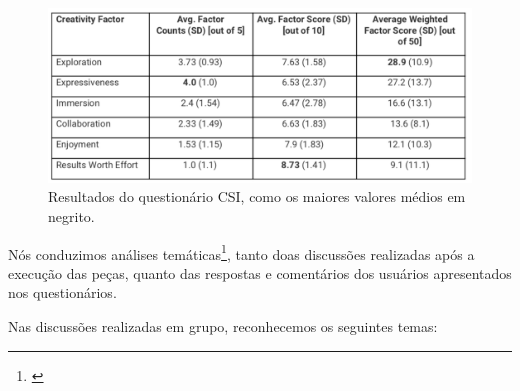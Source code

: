 \begin{figure}

\includegraphics[width=1\textwidth]{pictures/cap4/CSI}
\caption{Resultados do questionário CSI, como os maiores valores médios em negrito.}
\label{fig:questionnaire}
\end{figure}


 

Nós conduzimos análises temáticas\footnote{\cite{Braun2006}}, tanto doas discussões realizadas após a execução das peças, quanto das respostas e comentários dos usuários apresentados nos questionários. 

Nas discussões realizadas em grupo, reconhecemos os seguintes temas:

